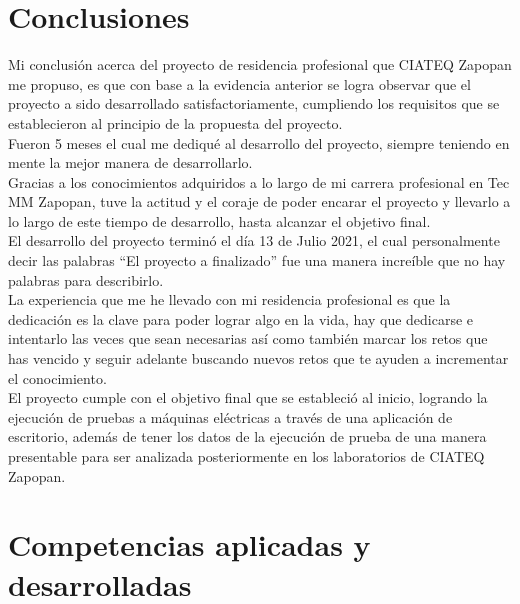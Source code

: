 \documentclass[12pt,titlepage]{article}
\begin{document}
\newpage
\section{Conclusiones}
Mi conclusión acerca del proyecto de residencia profesional que CIATEQ Zapopan me propuso, es que con base a la evidencia anterior se logra observar que el proyecto a sido desarrollado satisfactoriamente, cumpliendo los requisitos que se establecieron al principio de la propuesta del proyecto. \\ 

Fueron 5 meses el cual me dediqué al desarrollo del proyecto, siempre teniendo en mente la mejor manera de desarrollarlo. \\

Gracias a los conocimientos adquiridos a lo largo de mi carrera profesional en Tec MM Zapopan, tuve la actitud y el coraje de poder encarar el proyecto y llevarlo a lo largo de  este tiempo de desarrollo,  hasta alcanzar el objetivo final.\\ 


El desarrollo del proyecto terminó  el día 13 de Julio 2021, el cual personalmente decir las palabras  ``El proyecto a finalizado'' fue una manera increíble que no hay palabras para describirlo. \\

La experiencia que me he llevado con mi residencia profesional es que la dedicación es la clave para poder lograr algo en la vida, hay que dedicarse e intentarlo las veces que sean necesarias así como también marcar los retos que has vencido y seguir adelante buscando nuevos retos que te ayuden a incrementar el conocimiento. \\

El proyecto cumple con el objetivo final que se estableció al inicio, logrando la ejecución de pruebas a máquinas eléctricas a través de una aplicación de escritorio, además de tener los datos de la ejecución de prueba de una manera presentable para ser analizada posteriormente en los laboratorios de CIATEQ Zapopan. \\

\newpage
\section{Competencias aplicadas y desarrolladas}
\end{document}
